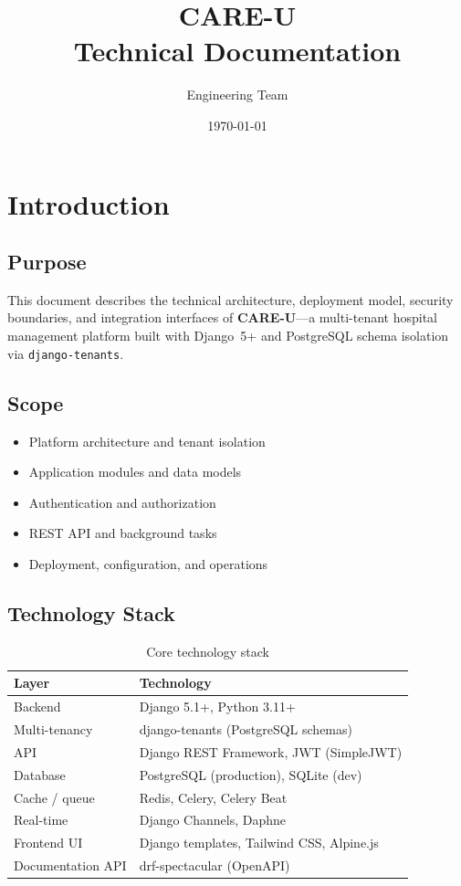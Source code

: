 \documentclass[11pt,a4paper]{report}
\title{\textbf{CARE-U}\\[0.4em]
\large Technical Documentation}
\author{Engineering Team}
\date{\today}
\begin{document}
\maketitle
\tableofcontents
\newpage

\chapter{Introduction}

\section{Purpose}
This document describes the technical architecture, deployment model, security boundaries, and integration interfaces of \textbf{CARE-U}---a multi-tenant hospital management platform built with Django~5+ and PostgreSQL schema isolation via \texttt{django-tenants}.

\section{Scope}
\begin{itemize}[noitemsep]
    \item Platform architecture and tenant isolation
    \item Application modules and data models
    \item Authentication and authorization
    \item REST API and background tasks
    \item Deployment, configuration, and operations
\end{itemize}

\section{Technology Stack}
\begin{table}[h]
\centering
\begin{tabular}{@{}ll@{}}
\toprule
\textbf{Layer} & \textbf{Technology} \\
\midrule
Backend & Django 5.1+, Python 3.11+ \\
Multi-tenancy & django-tenants (PostgreSQL schemas) \\
API & Django REST Framework, JWT (SimpleJWT) \\
Database & PostgreSQL (production), SQLite (dev) \\
Cache / queue & Redis, Celery, Celery Beat \\
Real-time & Django Channels, Daphne \\
Frontend UI & Django templates, Tailwind CSS, Alpine.js \\
Documentation API & drf-spectacular (OpenAPI) \\
\bottomrule
\end{tabular}
\caption{Core technology stack}
\end{table}
\end{document}
